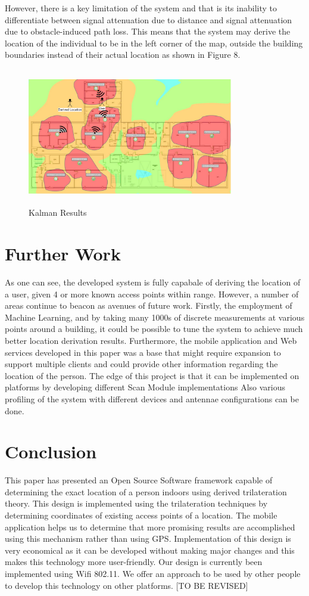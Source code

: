 \documentclass[conference]{IEEEtran}
\begin{document}
However, there is a key limitation of the system and that is its inability to differentiate between signal attenuation due to distance and signal attenuation due to obstacle-induced path loss. This means that the system may derive the location of the individual to be in the left corner of the map, outside the building boundaries instead of their actual location as shown in Figure 8.
\begin{figure}[H]
    \includegraphics[width=9.0cm,height=6cm]{Geolocation_3.jpeg}
    \caption{Kalman Results}
    \end{figure}

\section{Further Work}
As one can see, the developed system is fully capabale of deriving the location of a user, given 4 or more known access points within range. However, a number of areas continue to beacon as avenues of future work. Firstly, the employment of Machine Learning, and by taking many 1000s of discrete measurements at various points around a building, it could be possible to tune the system to achieve much better location derivation results.  Furthermore, the mobile application and Web services developed in this paper was a base that might require expansion  to support multiple clients and could provide other information regarding the location of the person. The edge of this project is that it can be implemented on platforms by developing different Scan Module implementations Also various profiling of the system with different devices and antennae configurations can be done.

\section{Conclusion}
This paper has presented an Open Source Software framework capable of determining the exact location of a person indoors using derived trilateration theory. This design is implemented using the trilateration techniques by determining coordinates of existing access points of a location. The mobile application helps us to determine that more promising results are accomplished using this mechanism rather than using GPS. 
\newline Implementation of this design is very economical as it can be developed without making major changes and this makes this technology more user-friendly. Our design is currently been implemented using Wifi 802.11. We offer an approach to be used by other people to develop this technology on other platforms. [TO BE REVISED]
\printbibliography
\end{document}
